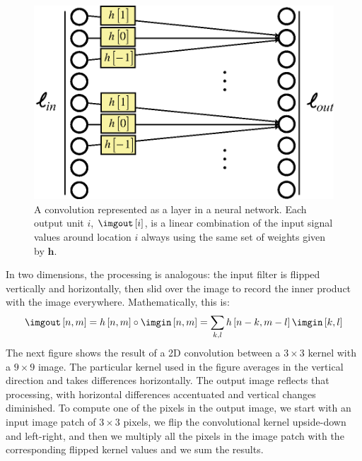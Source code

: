 \begin{figure}[h!]
\centerline{
\includegraphics[width=.5\linewidth]{figures/linear_image_filtering/conv_filter2.eps}
} 
\caption{A convolution represented as a layer in a neural network. Each output unit $i$, $\imgout \left[i \right]$, is a linear combination of the input signal values around location $i$ always using the same set of weights given by $\mathbf{h}$.}
\label{fig:conv_filter2_nn}
\end{figure}


In two dimensions, the processing is analogous:  
the input filter is flipped vertically and horizontally, then slid over the
image to record the inner product with the image everywhere.
Mathematically, this is:
\begin{equation}
\imgout \left[n,m\right] = h \left[n,m\right] \circ \imgin \left[n,m\right] =  \sum_{k,l}h \left[n-k,m-l \right] \imgin \left[k,l \right]
\label{eq:2dconv}
\end{equation}
The next figure shows the result of a 2D convolution between a $3 \times 3$ kernel with a $9 \times 9$ image. The particular kernel used in the figure averages in the
vertical direction and takes differences horizontally. The output
image reflects that processing, with horizontal differences
accentuated and vertical changes diminished. To compute one of the pixels in the output image, we start with an input image patch of $3 \times 3$ pixels, we flip the convolutional kernel upside-down and left-right, and then we multiply all the pixels in the image patch with the corresponding flipped kernel values and we sum the results. 

